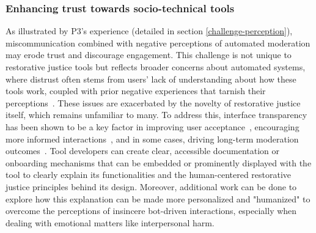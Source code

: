 \subsubsection{Enhancing trust towards socio-technical tools}
As illustrated by P3’s experience (detailed in section \ref{challenge-perception}), miscommunication combined with negative perceptions of automated moderation may erode trust and discourage engagement. This challenge is not unique to restorative justice tools but reflects broader concerns about automated systems, where distrust often stems from users’ lack of understanding about how these tools work, coupled with prior negative experiences that tarnish their perceptions~\cite{Lee2018, Hoffman2013, Kuo2023}. These issues are exacerbated by the novelty of restorative justice itself, which remains unfamiliar to many.
To address this, interface transparency has been shown to be a key factor in improving user acceptance~\cite{Kizilcec2016}, encouraging more informed interactions~\cite{Eslami2019}, and in some cases, driving long-term moderation outcomes~\cite{Jhaver2019}. Tool developers can create clear, accessible documentation or onboarding mechanisms that can be embedded or prominently displayed with the tool to clearly explain its functionalities and the human-centered restorative justice principles behind its design. Moreover, additional work can be done to explore how this explanation can be made more personalized and "humanized" to overcome the perceptions of insincere bot-driven interactions, especially when dealing with emotional matters like interpersonal harm.



